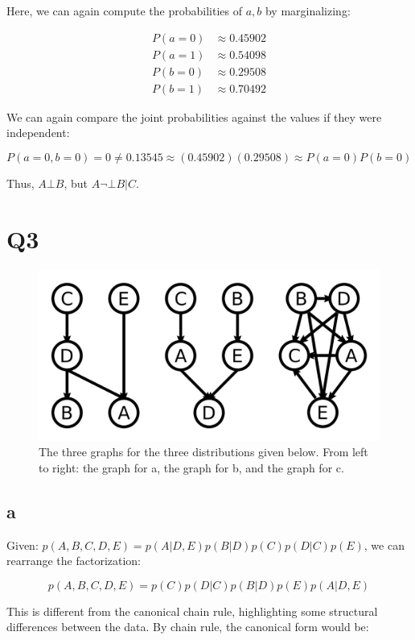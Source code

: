 \documentclass{article}
\begin{document}
Here, we can again compute the probabilities of $a, b$ by marginalizing:

\begin{align*}
P(a = 0) &\approx 0.45902 \\
P(a = 1) &\approx 0.54098 \\
P(b = 0) &\approx 0.29508 \\
P(b = 1) &\approx 0.70492
\end{align*}

We can again compare the joint probabilities against the values if they were 
independent:

$$
P(a = 0, b = 0) = 0 \neq 0.13545 \approx (0.45902)(0.29508) \approx P(a = 0)P(b = 0)
$$

Thus, $ A \bot B $, but $ A \neg \bot B | C $.

\section{Q3}

\begin{figure}[!ht]
	\centering
	\includegraphics[width=120mm]{q3-all-graphs.png}
	\caption{The three graphs for the three distributions given below. From left to right: the graph for a, the graph for b, and the graph for c.}
\end{figure}

\subsection{a}

Given: $ p(A, B, C, D, E) = p(A | D, E) p(B | D) p(C) p(D | C) p(E) $, we can 
rearrange the factorization:

$$
p(A, B, C, D, E) = p(C) p(D | C) p(B | D) p(E) p(A | D, E)
$$

This is different from the canonical chain rule, highlighting some structural 
differences between the data. By chain rule, the canonical form would be:
\end{document}
